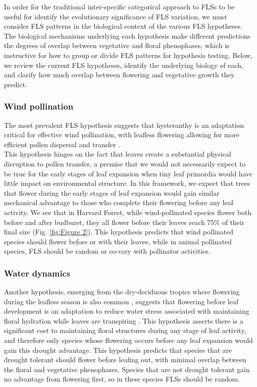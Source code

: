 \documentclass[12pt]{article}
\begin{document}
\indent In order for the traditional inter-specific categorical approach to FLSs to be useful for identify the evolutionary significance of FLS variation, we must consider FLS patterns in the biological context of the various FLS hypotheses. The biological mechanisms underlying each hypothesis make different predictions the degrees of overlap between vegetative and floral phenophases, which is instructive for how to group or divide FLS patterns for hypothesis testing. Below, we review the current FLS hypotheses, identify the underlying biology of each, and clarify how much overlap between flowering and vegetative growth they predict.

\subsubsection*{ Wind pollination}
\indent\indent The most prevalent FLS hypothesis suggests that hysteranthy is an adaptation critical for effective wind pollination, with leafless flowering allowing for more efficient pollen dispersal and transfer \citep{Whitehead1969, Spurr1980,Friedman2009}.\\
 This hypothesis hinges on the fact that leaves create a substantial physical disruption to pollen transfer, a premise that we would not necessarily expect to be true for the early stages of leaf expansion when tiny leaf primordia would have little impact on environmental structure. In this framework, we expect that trees that flower during the early stages of leaf expansion would gain similar mechanical advantage to those who complete their flowering before any leaf activity. We see that in Harvard Forest, while wind-pollinated species flower both before and after budburst, they all flower before their leaves reach 75\% of their final size (Fig. \ref{fig:Figure 2}). This hypothesis predicts that wind pollinated species should flower before or with their leaves, while in animal pollinated species, FLS should be random or co-vary with pollinator activities. %

\subsubsection*{Water dynamics}
\indent\indent Another hypothesis, emerging from the dry-deciduous tropics where flowering during the leafless season is also common \citep{Janzen1967}, suggests that flowering before leaf development is an adaptation to reduce water stress associated with maintaining floral hydration while leaves are transpiring \citep{Franklin2016}. This hypothesis asserts there is a significant cost to maintaining floral structures during any stage of leaf activity, and therefore only species whose flowering occurs before any leaf expansion would gain this drought advantage. This hypothesis predicts that species that are drought tolerant should flower before leafing out, with minimal overlap between the floral and vegetative phenophases. Species that are not drought tolerant gain no advantage from flowering first, so in these species FLSs should be random.
\end{document}
